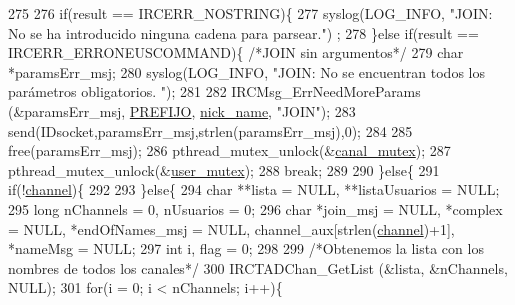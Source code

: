 \begin{DoxyCode}
{275 
276                 \textcolor{keywordflow}{if}(result == IRCERR\_NOSTRING)\{
277                                 syslog(LOG\_INFO, \textcolor{stringliteral}{"JOIN: No se ha introducido ninguna cadena para parsear."})
      ;
278                         \}\textcolor{keywordflow}{else} \textcolor{keywordflow}{if}(result == IRCERR\_ERRONEUSCOMMAND)\{ \textcolor{comment}{/*JOIN sin argumentos*/}
279                                 \textcolor{keywordtype}{char} *paramsErr\_msj;
280                                 syslog(LOG\_INFO, \textcolor{stringliteral}{"JOIN: No se encuentran todos los parámetros obligatorios.
      "});
281 
282                                 IRCMsg\_ErrNeedMoreParams (&paramsErr\_msj, 
      \hyperlink{_g-2361-06-_p1-_server_8h_a78c658ff923693099f7b621e7c351129}{PREFIJO}, \hyperlink{_g-2361-06-_p1-_server_8c_aabbf66718cda228b924a4a9441eadf62}{nick\_name}, \textcolor{stringliteral}{"JOIN"});
283                                 send(IDsocket,paramsErr\_msj,strlen(paramsErr\_msj),0);
284 
285                                 free(paramsErr\_msj);
286                                 pthread\_mutex\_unlock(&\hyperlink{_g-2361-06-_p1-_server_8c_ab86a544a49de18195048bac54dd3ac3e}{canal\_mutex});
287                                 pthread\_mutex\_unlock(&\hyperlink{_g-2361-06-_p1-_server_8c_a5dedd07a1144d2ab70b74a8e64b6a7c0}{user\_mutex});
288                                 \textcolor{keywordflow}{break};
289 
290                         \}\textcolor{keywordflow}{else}\{                          
291                                 \textcolor{keywordflow}{if}(!\hyperlink{_g-2361-06-_p1-_server_8c_a842ca2f026578e5c479c095ff3335969}{channel})\{
292 
293                                 \}\textcolor{keywordflow}{else}\{
294                                         \textcolor{keywordtype}{char} **lista = NULL, **listaUsuarios = NULL;
295                                         \textcolor{keywordtype}{long} nChannels = 0, nUsuarios = 0;
296                                         \textcolor{keywordtype}{char} *join\_msj = NULL, *complex = NULL, *endOfNames\_msj = NULL, 
      channel\_aux[strlen(\hyperlink{_g-2361-06-_p1-_server_8c_a842ca2f026578e5c479c095ff3335969}{channel})+1], *nameMsg = NULL;
297                                         \textcolor{keywordtype}{int} i, flag = 0;
298 
299                                         \textcolor{comment}{/*Obtenemos la lista con los nombres de todos los canales*/}
300                                         IRCTADChan\_GetList (&lista, &nChannels, NULL);
301                                         \textcolor{keywordflow}{for}(i = 0; i < nChannels; i++)\{
}
\end{DoxyCode}
